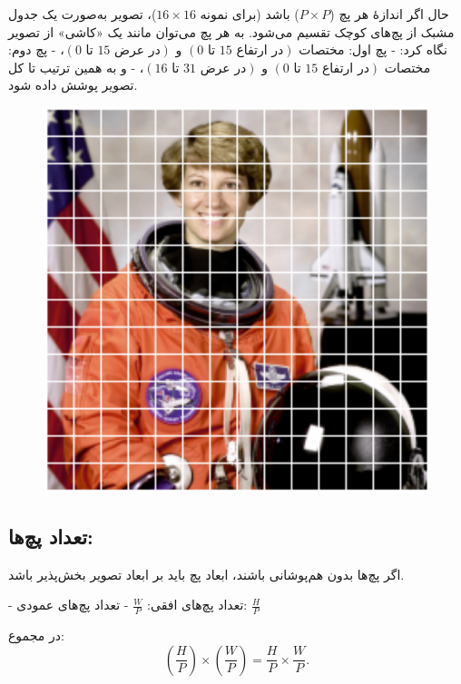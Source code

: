 حال اگر اندازهٔ هر پچ (\(P \times P\)) باشد (برای نمونه \(16 \times 16\))، تصویر به‌صورت یک جدول مشبک از پچ‌های کوچک تقسیم می‌شود.  
به هر پچ می‌توان مانند یک «کاشی» از تصویر نگاه کرد:
- پچ اول: مختصات \((0 \text{ تا } 15 \text{ در ارتفاع}) \) و \((0 \text{ تا } 15 \text{ در عرض})\)،  
- پچ دوم: مختصات \((0 \text{ تا } 15 \text{ در ارتفاع}) \) و \((16 \text{ تا } 31 \text{ در عرض})\)،  
- و به همین ترتیب تا کل تصویر پوشش داده شود.

\begin{figure}[h]
	\centering
	\begin{minipage}[b]{0.9\textwidth}
		\centering
		\includegraphics[width=\textwidth]{transformer_images/space_patch_iamge.png}
		\caption{}
		\label{fig:Patch Image}
	\end{minipage}
	\hfill
\end{figure}

\subsection{تعداد پچ‌ها:}
اگر پچ‌ها بدون هم‌پوشانی باشند، ابعاد پچ باید بر ابعاد تصویر بخش‌پذیر باشد.  

- تعداد پچ‌های افقی: \(\frac{W}{P}\)  
- تعداد پچ‌های عمودی: \(\frac{H}{P}\)  

در مجموع:  
\begin{equation}
	\left(\frac{H}{P}\right) \times \left(\frac{W}{P}\right) = \frac{H}{P} \times \frac{W}{P}.
	\label{eq:grid_size}
\end{equation}


